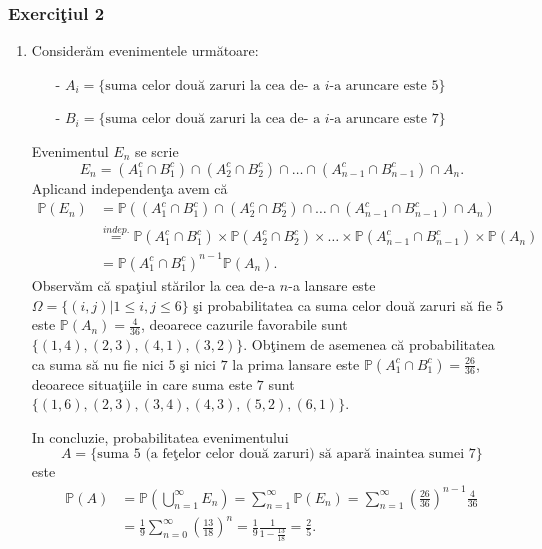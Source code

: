 \documentclass[]{article}
\def\Om{\Omega}
\def\PP{{\mathbb P}}
\begin{document}
\subsubsection{\texorpdfstring{Exerci\c tiul
2}{Exerciiul 2}}\label{exerciiul-2}

\begin{enumerate}
\item Consider\u am evenimentele urm\u atoare: 
  \begin{itemize}
    \item[-] $A_i=\{\mbox{suma celor dou\u a zaruri la cea de- a $i$-a aruncare este $5$}\}$
    \item[-] $B_i=\{\mbox{suma celor dou\u a zaruri la cea de- a $i$-a aruncare este $7$}\}$
  \end{itemize}  
Evenimentul $E_n$ se scrie
    \begin{equation*}
        E_n = (A_1^c\cap B_1^c)\cap(A_2^c\cap B_2^c)\cap\dots\cap(A_{n-1}^c\cap B_{n-1}^c)\cap A_n.
    \end{equation*}
Aplicand independen\c ta avem c\u a
    \begin{align*}
        \PP(E_n) &= \PP((A_1^c\cap B_1^c)\cap(A_2^c\cap B_2^c)\cap\dots\cap(A_{n-1}^c\cap B_{n-1}^c)\cap A_n)\\
                 &\overset{indep.}{=} \PP(A_1^c\cap B_1^c)\times \PP(A_2^c\cap B_2^c)\times\dots\times \PP(A_{n-1}^c\cap B_{n-1}^c)\times \PP(A_n)\\
                 &= \PP(A_1^c\cap B_1^c)^{n-1}\PP(A_n).
    \end{align*}
Observ\u am c\u a spa\c tiul st\u arilor la cea de-a $n$-a lansare este $\Om=\{(i,j)|1\leq i,j\leq6\}$ \c si probabilitatea ca suma celor dou\u a zaruri s\u a fie $5$ este $\PP(A_n) = \frac{4}{36}$, deoarece cazurile favorabile sunt $\{(1,4),(2,3),(4,1),(3,2)\}$. Ob\c tinem de asemenea c\u a probabilitatea ca suma s\u a nu fie nici $5$ \c si nici $7$ la prima lansare este $\PP(A_1^c\cap B_1^c) = \frac{26}{36}$, deoarece situa\c tiile in care suma este $7$ sunt $\{(1,6),(2,3),(3,4),(4,3),(5,2),(6,1)\}$.
\par \noindent
In concluzie, probabilitatea evenimentului 
$$
  A=\{\mbox{suma $5$ (a fe\c telor celor dou\u a zaruri) s\u a apar\u a inaintea sumei $7$}\}
$$ 
este 
\begin{align*}
    \PP(A) &= \displaystyle\PP\left(\bigcup_{n=1}^{\infty}E_n\right)=\sum_{n=1}^{\infty}\PP(E_n)=\sum_{n=1}^{\infty}\left(\frac{26}{36}\right)^{n-1}\frac{4}{36}\\
            &= \frac{1}{9}\sum_{n=0}^{\infty}\left(\frac{13}{18}\right)^{n} = \frac{1}{9}\frac{1}{1-\frac{13}{18}}=\frac{2}{5}.

\end{align*}
\end{enumerate}
\end{document}
